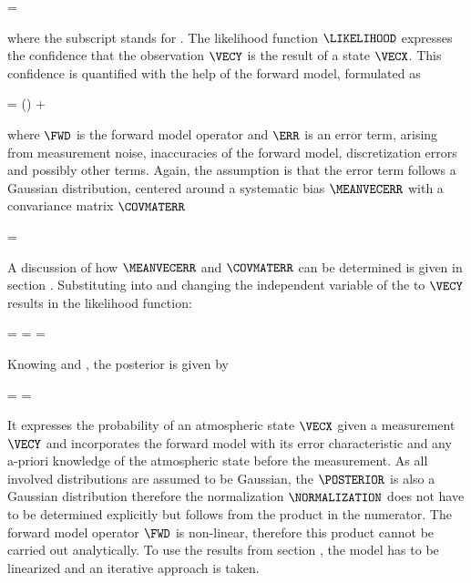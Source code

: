     \startformula
        \PRIOR = \GAUSS{\VECX}{\MEANVECA}{\COVMATA} \EQCOMMA
    \stopformula

    where the subscript  stands for .  The likelihood
    function $\LIKELIHOOD$ expresses the confidence that the observation
    $\VECY$ is the result of a state $\VECX$. This confidence is quantified
    with the help of the forward model, formulated as

    \startformula
        \VECY = \FWD(\VECX) + \ERR \EQCOMMA
    \stopformula

    where $\FWD$ is the forward model operator and $\ERR$ is an error term,
    arising from measurement noise, inaccuracies of the forward model,
    discretization errors and possibly other terms. Again, the assumption is
    that the error term follows a Gaussian distribution, centered around
    a systematic bias $\MEANVECERR$ with a convariance matrix $\COVMATERR$

    \startformula
        \PROB{\ERR} = \GAUSS{\ERR}{\MEANVECERR}{\COVMATERR} \EQSTOP
    \stopformula

    A discussion of how $\MEANVECERR$ and $\COVMATERR$ can be determined is
    given in section . Substituting 
    into  and changing the independent variable of
    the {\PDF} to $\VECY$ results in the likelihood function:
    
    \placesubformula
    \startformula
    \startalign[n=3,align={right,middle,left}]
        \NC \PROB{\VECY - \FWD(\VECX)} = \NC
            \GAUSS{\VECY - \FWD(\VECX)}{\MEANVECERR}{\COVMATERR} \NC \NR
        \NC = \NC \GAUSS{\VECY}{\FWD(\VECX)+\MEANVECERR}{\COVMATERR} \NC
            = \LIKELIHOOD \EQSTOP {}
    \stopalign
    \stopformula

    Knowing  and , the
    posterior {\PDF} is given by

    \startformula
        \POSTERIOR
        = \frac{\LIKELIHOOD \PRIOR}{\NORMALIZATION}
        = \frac{\GAUSS{\VECY}{\FWD(\VECX) + \MEANVECERR}{\COVMATERR}
            ~\GAUSS{\VECX}{\MEANVECA}{\COVMATA}}{\NORMALIZATION} \EQSTOP
    \stopformula

    It expresses the probability of an atmospheric state $\VECX$ given a
    measurement $\VECY$ and incorporates the forward model with its error
    characteristic and any a-priori knowledge of the atmospheric state before
    the measurement. As all involved distributions are assumed to be Gaussian,
    the $\POSTERIOR$ is also a Gaussian distribution therefore the
    normalization $\NORMALIZATION$ does not have to be determined explicitly
    but follows from the product in the numerator. The forward model operator
    $\FWD$ is non-linear, therefore this product cannot be carried out
    analytically. To use the results from section , the
    model has to be linearized and an iterative approach is taken.

